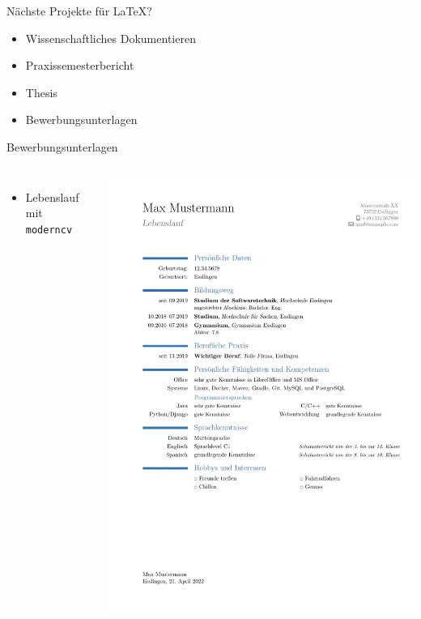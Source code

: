 \documentclass[presentation,aspectratio=169]{beamer}
\begin{document}
\begin{frame}{Nächste Projekte für \LaTeX{}?}
  \begin{itemize}
    \item Wissenschaftliches Dokumentieren
    \item Praxissemesterbericht
    \item Thesis
    \bigskip
    \item Bewerbungsunterlagen
  \end{itemize}
\end{frame}

\begin{frame}[fragile]{Bewerbungsunterlagen}
  \begin{columns}
      \centering
      \begin{itemize}
        \item Lebenslauf mit \verb|moderncv|
      \end{itemize}
      \includegraphics[height=.7\textheight]{Lebenslauf}

\end{columns}
\end{frame}
\end{document}
